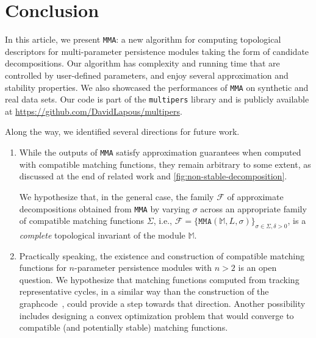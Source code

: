\documentclass{article}
\newcommand{\matching}{\sigma}
\newcommand{\Mbb}{\mathbb{M}}
\newcommand{\M}{{\mathbb M}}
\newcommand{\MMA}{\texttt{MMA}}
\newcommand{\mmaout}{candidate}
\newcommand{\mmaoutcompat}{approximate}
\newcommand{\rebuttal}[1]{{ #1}}
\begin{document}
\section{Conclusion}
\label{sec:conclusion}


\rebuttal{In this article, we present \MMA: a new algorithm for computing topological \rebuttal{descriptors} for multi-parameter persistence modules taking the form of \mmaout{} decompositions. Our algorithm %
	has complexity and running time
	that are controlled by user-defined parameters,
	and enjoy several approximation and stability properties.
	We also showcased the performances of \MMA{} on
	synthetic and real data sets.
	Our code is \rebuttal{
		part of the \texttt{multipers} library \cite{loiseauxMultipersMultiparameterPersistence2024} and is} publicly available at \url{https://github.com/DavidLapous/multipers}.} \\

\rebuttal{
	Along the way, we identified
	several directions
	for future work.
	\begin{enumerate}
		\item  %
		      While the outputs of \MMA{} satisfy approximation guarantees when computed with compatible matching functions, they remain arbitrary to some extent, as discussed at the end of related work and \cref{fig:non-stable-decomposition}. %

		      We hypothesize that, in the general case, the family $\mathcal F$ of \mmaoutcompat{} decompositions obtained from \MMA{} by varying $\matching$ across an appropriate family of compatible matching functions $\Sigma$, i.e., $\mathcal F=\{\MMA{}(\M,L,\sigma)\}_{\sigma\in \Sigma, \delta >0}$,
		      is a {\em complete} topological invariant of the module $\Mbb$.


		\item Practically speaking, the existence and construction of compatible matching functions for $n$-parameter persistence modules with $n>2$ is an open question. We hypothesize that matching functions computed from tracking representative cycles, in a similar way than
		      the construction of the graphcode~\cite{russoldGraphcodeLearningMultiparameter2024, kerberRepresentingTwoparameterPersistence2025}, could provide a step towards that direction.
		      Another possibility includes designing a convex optimization problem that would converge to compatible (and potentially stable) matching functions.














	\end{enumerate}
}
\end{document}
